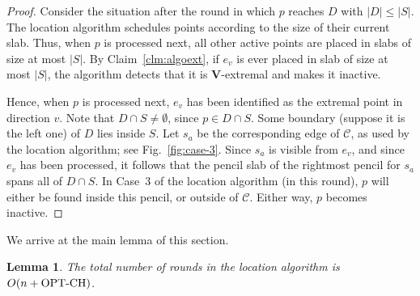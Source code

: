 \documentclass[letterpaper,11pt]{article}
\newtheorem{lemma}[theorem]{Lemma}
\newcommand{\OPTCH}{\text{OPT-CH}}
\newcommand{\cC}{\mathcal{C}}
\begin{document}
\begin{proof} 
Consider the situation after 
the round in which $p$ reaches $D$ 
with $|D| \leq |S|$. 
The location algorithm schedules 
points according to the size 
of their current slab. 
Thus, when $p$ is processed next, 
all other active points are placed 
in slabs of size at most $|S|$. 
By Claim~\ref{clm:algoext},
if $e_v$ is ever placed in slab of size 
at most $|S|$, the algorithm
detects that it is $\textbf{V}$-extremal 
and makes it inactive.

Hence, when $p$ is processed next, 
$e_v$ has been identified
as the extremal point in direction
$v$. Note that $D \cap S \neq \emptyset$,
since $p \in D \cap S$. Some 
boundary (suppose it is the left one) of $D$
lies inside $S$. Let $s_a$ be the 
corresponding edge of $\cC$, as used by 
the location algorithm; see Fig.~\ref{fig:case-3}.
Since $s_a$ is visible from $e_v$, 
and since $e_v$ has been processed,
it follows that the pencil 
slab of the rightmost pencil 
for $s_a$ spans all of $D \cap S$.
In Case~3 of the location algorithm 
(in this round), $p$
will either be found inside this 
pencil, or outside of $\cC$.
Either way, $p$ becomes inactive.
\end{proof}

We arrive at the main lemma of this section.

\begin{lemma}\label{lem:algoCH} 
  The total number of rounds in 
  the location algorithm is 
  $O(n + \textup{\OPTCH})$.
\end{lemma}
\end{document}
